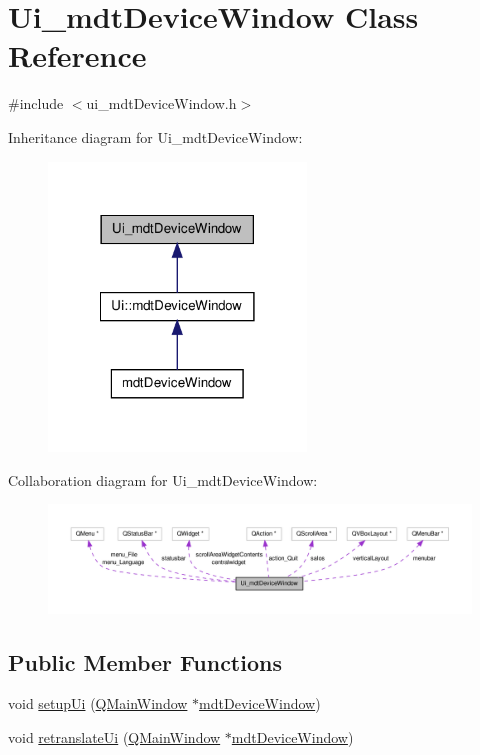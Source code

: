 \hypertarget{class_ui__mdt_device_window}{\section{Ui\-\_\-mdt\-Device\-Window Class Reference}
\label{class_ui__mdt_device_window}
}


{\ttfamily \#include $<$ui\-\_\-mdt\-Device\-Window.\-h$>$}



Inheritance diagram for Ui\-\_\-mdt\-Device\-Window\-:\nopagebreak
\begin{figure}[H]
\begin{center}
\leavevmode
\includegraphics[width=194pt]{class_ui__mdt_device_window__inherit__graph}
\end{center}
\end{figure}


Collaboration diagram for Ui\-\_\-mdt\-Device\-Window\-:\nopagebreak
\begin{figure}[H]
\begin{center}
\leavevmode
\includegraphics[width=350pt]{class_ui__mdt_device_window__coll__graph}
\end{center}
\end{figure}
\subsection*{Public Member Functions}
\begin{DoxyCompactItemize}
\item 
void \hyperlink{class_ui__mdt_device_window_a0cdedb1dd83eba2873d0c17c529a30ca}{setup\-Ui} (\hyperlink{class_q_main_window}{Q\-Main\-Window} $\ast$\hyperlink{classmdt_device_window}{mdt\-Device\-Window})
\item 
void \hyperlink{class_ui__mdt_device_window_af16eccf51af471614d5798135a342119}{retranslate\-Ui} (\hyperlink{class_q_main_window}{Q\-Main\-Window} $\ast$\hyperlink{classmdt_device_window}{mdt\-Device\-Window})
\end{DoxyCompactItemize}
